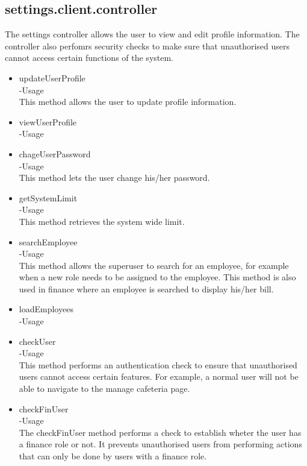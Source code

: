 \documentclass[a4paper,12pt]{article}
\begin{document}
 \subsection{settings.client.controller}
 The settings controller allows the user to view and edit profile information. The controller also perfomrs security checks to make sure that unauthorised users cannot access certain functions of the system. 
 \begin{itemize}
 \item updateUserProfile\\
 -Usage\\
 This method allows the user to update profile information.
\item viewUserProfile\\
-Usage\\

\item chageUserPassword\\
-Usage\\
This method lets the user change his/her password.

\item getSystemLimit\\
-Usage\\
This method retrieves the system wide limit.

\item searchEmployee\\
-Usage\\
This method allows the superuser to search for an employee, for example when a new role needs to be assigned to the employee.
This method is also used in finance where an employee is searched to display his/her bill.

\item loadEmployees\\
-Usage\\

\item checkUser\\
-Usage\\
This method performs an authentication check to ensure that unauthorised users cannot access certain features. For example, a normal user will not be able to navigate to the manage cafeteria page.

\item checkFinUser\\
-Usage\\
The checkFinUser method performs a check to establish wheter the user has a finance role or not. It prevents unauthorised users from performing actions that can only be done by users with a finance role.
 \end{itemize}
 
\end{document}
